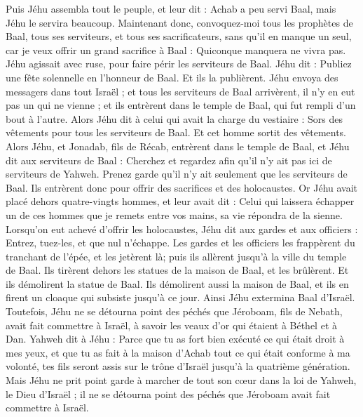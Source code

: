 \begin{multicols}{2}
Puis Jéhu assembla tout le peuple, et leur dit : Achab a peu servi Baal, mais Jéhu le servira beaucoup.
Maintenant donc, convoquez-moi tous les prophètes de Baal, tous ses serviteurs, et tous ses sacrificateurs, sans qu'il en manque un seul, car je veux offrir un grand sacrifice à Baal : Quiconque manquera ne vivra pas. Jéhu agissait avec ruse, pour faire périr les serviteurs de Baal.
Jéhu dit : Publiez une fête solennelle en l'honneur de Baal. Et ils la publièrent.
Jéhu envoya des messagers dans tout Israël ; et tous les serviteurs de Baal arrivèrent, il n'y en eut pas un qui ne vienne ; et ils entrèrent dans le temple de Baal, qui fut rempli d'un bout à l'autre.
Alors Jéhu dit à celui qui avait la charge du vestiaire : Sors des vêtements pour tous les serviteurs de Baal. Et cet homme sortit des vêtements.
Alors Jéhu, et Jonadab, fils de Récab, entrèrent dans le temple de Baal, et Jéhu dit aux serviteurs de Baal : Cherchez et regardez afin qu'il n'y ait pas ici de serviteurs de Yahweh. Prenez garde qu'il n'y ait seulement que les serviteurs de Baal.
Ils entrèrent donc pour offrir des sacrifices et des holocaustes. Or Jéhu avait placé dehors quatre-vingts hommes, et leur avait dit : Celui qui laissera échapper un de ces hommes que je remets entre vos mains, sa vie répondra de la sienne.
Lorsqu'on eut achevé d'offrir les holocaustes, Jéhu dit aux gardes et aux officiers : Entrez, tuez-les, et que nul n'échappe. Les gardes et les officiers les frappèrent du tranchant de l'épée, et les jetèrent là; puis ils allèrent jusqu'à la ville du temple de Baal.
Ils tirèrent dehors les statues de la maison de Baal, et les brûlèrent.
Et ils démolirent la statue de Baal. Ils démolirent aussi la maison de Baal, et ils en firent un cloaque qui subsiste jusqu'à ce jour.
Ainsi Jéhu extermina Baal d'Israël.
Toutefois, Jéhu ne se détourna point des péchés que Jéroboam, fils de Nebath, avait fait commettre à Israël, à savoir les veaux d'or qui étaient à Béthel et à Dan.
Yahweh dit à Jéhu : Parce que tu as fort bien exécuté ce qui était droit à mes yeux, et que tu as fait à la maison d'Achab tout ce qui était conforme à ma volonté, tes fils seront assis sur le trône d'Israël jusqu'à la quatrième génération.
Mais Jéhu ne prit point garde à marcher de tout son cœur dans la loi de Yahweh, le Dieu d'Israël ; il ne se détourna point des péchés que Jéroboam avait fait commettre à Israël.

\end{multicols}
